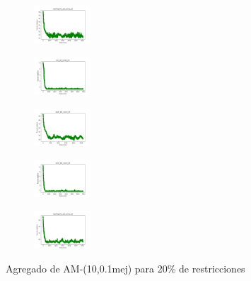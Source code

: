 \begin{figure}[H]
\begin{subfigure}
        \centering
        \includegraphics[width=0.234\textwidth]{img/am01mej/newthyroid_set_const_20_49258669_cost.png}
    \end{subfigure}
    \hfill
    \begin{subfigure}
        \centering
        \includegraphics[width=0.234\textwidth]{img/am01mej/iris_set_const_20_3773969821_cost.png}
    \end{subfigure}
    \hfill
    \begin{subfigure}
        \centering
        \includegraphics[width=0.234\textwidth]{img/am01mej/ecoli_set_const_20_3773969821_cost.png}
    \end{subfigure}
    \hfill
    \begin{subfigure}
        \centering
        \includegraphics[width=0.234\textwidth]{img/am01mej/rand_set_const_20_3773969821_cost.png}
    \end{subfigure}
    \hfill
    \begin{subfigure}
        \centering
        \includegraphics[width=0.234\textwidth]{img/am01mej/newthyroid_set_const_20_3773969821_cost.png}
    \end{subfigure}
    \caption{Agregado de AM-(10,0.1mej) para 20\% de restricciones}
\end{figure}

\vspace*{\fill}
\newpage

